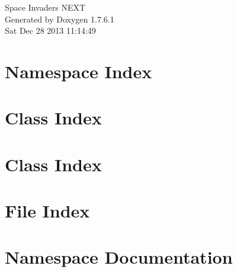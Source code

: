 \documentclass[a4paper]{book}
\begin{document}
\hypersetup{pageanchor=false,citecolor=blue}
\begin{titlepage}
\vspace*{7cm}
\begin{center}
{\Large \-Space \-Invaders \-N\-E\-X\-T }\\
\vspace*{1cm}
{\large \-Generated by Doxygen 1.7.6.1}\\
\vspace*{0.5cm}
{\small Sat Dec 28 2013 11:14:49}\\
\end{center}
\end{titlepage}
\clearemptydoublepage
{}
\tableofcontents
\clearemptydoublepage
{}
\hypersetup{pageanchor=true,citecolor=blue}
\chapter{\-Namespace \-Index}

\chapter{\-Class \-Index}

\chapter{\-Class \-Index}

\chapter{\-File \-Index}

\chapter{\-Namespace \-Documentation}






\end{document}
